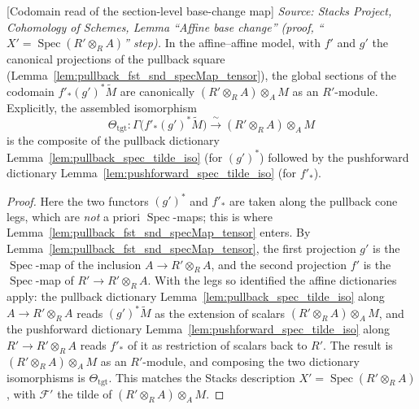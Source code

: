 \begin{lemma}



[Codomain read of the section-level base-change map]
  \label{lem:base_change_mate_codomain_read}
  \textit{Source: Stacks Project, Cohomology of Schemes, Lemma ``Affine base
  change'' (proof, ``\(X' = \operatorname{Spec}(R' \otimes_R A)\)'' step).}
  In the affine--affine model, with \(f'\) and \(g'\) the canonical projections of the
  pullback square (Lemma~\ref{lem:pullback_fst_snd_specMap_tensor}), the global
  sections of the codomain \(f'_*(g')^*\widetilde M\) are canonically
  \((R' \otimes_R A) \otimes_A M\) as an \(R'\)-module. Explicitly, the assembled
  isomorphism
  \[
    \Theta_{\mathrm{tgt}} :
    \Gamma\bigl(f'_*(g')^*\widetilde M\bigr)
    \xrightarrow{\ \sim\ } (R' \otimes_R A) \otimes_A M
  \]
  is the composite of the pullback dictionary Lemma~\ref{lem:pullback_spec_tilde_iso}
  (for \((g')^*\)) followed by the pushforward dictionary
  Lemma~\ref{lem:pushforward_spec_tilde_iso} (for \(f'_*\)).
\end{lemma}

\begin{proof}
  Here the two functors \((g')^*\) and \(f'_*\) are taken along the pullback cone legs,
  which are \emph{not} a priori \(\operatorname{Spec}\)-maps; this is where
  Lemma~\ref{lem:pullback_fst_snd_specMap_tensor} enters. By
  Lemma~\ref{lem:pullback_fst_snd_specMap_tensor}, the first projection \(g'\) is the
  \(\operatorname{Spec}\)-map of the inclusion \(A \to R' \otimes_R A\), and the second
  projection \(f'\) is the \(\operatorname{Spec}\)-map of \(R' \to R' \otimes_R A\).
  With the legs so identified the affine dictionaries apply:
  the pullback dictionary Lemma~\ref{lem:pullback_spec_tilde_iso} along
  \(A \to R' \otimes_R A\) reads \((g')^*\widetilde M\) as the extension of scalars
  \((R' \otimes_R A) \otimes_A M\), and the pushforward dictionary
  Lemma~\ref{lem:pushforward_spec_tilde_iso} along \(R' \to R' \otimes_R A\) reads
  \(f'_*\) of it as restriction of scalars back to \(R'\). The result is
  \((R' \otimes_R A) \otimes_A M\) as an \(R'\)-module, and composing the two dictionary
  isomorphisms is \(\Theta_{\mathrm{tgt}}\). This matches the Stacks description
  \(X' = \operatorname{Spec}(R' \otimes_R A)\), with \(\mathcal{F}'\) the tilde of
  \((R' \otimes_R A) \otimes_A M\).
\end{proof}


